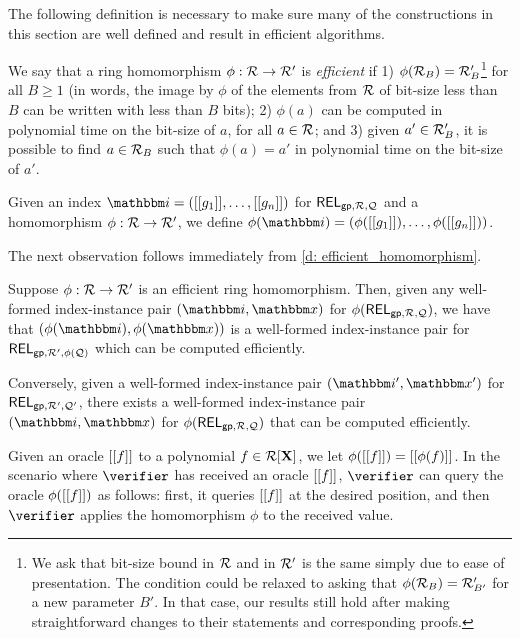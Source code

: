 \documentclass[11pt,letterpaper,usenames,dvipsnames]{article}
\begin{document}
    The following definition is necessary to make sure many of the constructions in this section are well defined and result in efficient algorithms. 

    \begin{definition}\label{d: efficient_homomorphism}
        We say that a ring homomorphism $\phi:\mathcal{R} \to \mathcal{R}'$ is \emph{efficient} if 1) $\phi(\mathcal{R}_B)= \mathcal{R}_B'$\footnote{We ask that  bit-size bound in $\mathcal{R}$ and in $\mathcal{R}'$ is the same simply due to ease of presentation. The  condition could be relaxed to asking that $\phi(\mathcal{R}_B)= \mathcal{R}_{B'}'$ for a new parameter $B'$. In that case, our results still hold after making straightforward changes to their statements and corresponding proofs.} for all $B\geq 1$ (in words, the image by $\phi$ of the elements from $\mathcal{R}$ of bit-size less than $B$ can be written with less than $B$ bits); 2) $\phi(a)$ can be computed in polynomial time on the bit-size of $a$, for all $a\in \mathcal{R}$; and 3) given $a'\in \mathcal{R}_B'$, it is possible to find $a\in \mathcal{R}_B$ such that $\phi(a)=a'$ in polynomial time on the bit-size of $a'$.
    \end{definition}

    Given an index $\idx=(\oracle{g_1},\ldots, \oracle{g_n})$ for $\mathsf{REL}_{\mathsf{gp}, \mathcal{R}, \mathcal{Q}}$ and a homomorphism $\phi:\mathcal{R} \to \mathcal{R}'$, we define $\phi(\idx)=( \phi(\oracle{g_1}),\ldots, \phi(\oracle{g_n}))$.

The next observation follows immediately from \cref{d: efficient_homomorphism}.
\begin{remark}\label{r: well_formedness_preservation}
Suppose $\phi:\mathcal{R} \to \mathcal{R}'$  is an efficient ring homomorphism. Then, given any well-formed index-instance pair $(\idx,\inp)$ for $\phi(\mathsf{REL}_{\mathsf{gp},\mathcal{R},\mathcal{Q}})$, we have that $(\phi(\idx), \phi(\inp))$ is a well-formed index-instance pair for $\mathsf{REL}_{\mathsf{gp},\mathcal{R}', \phi(\mathcal{Q})}$ which can be computed efficiently. 

Conversely, given a well-formed index-instance pair $(\idx',\inp')$ for $\mathsf{REL}_{\mathsf{gp},\mathcal{R}',\mathcal{Q}'}$, there exists a well-formed index-instance pair $(\idx,\inp)$ for $\phi(\mathsf{REL}_{\mathsf{gp},\mathcal{R},\mathcal{Q}})$ that can be computed efficiently.
\end{remark}

    
    Given an oracle $[[{f}]]$ to a polynomial $f\in \mathcal{R}[\mathbf{X}]$, we let $\phi([[{f}]])= [[{\phi(f)}]]$. In the scenario where $\verifier$ has received an oracle $[[{f}]]$, $\verifier$ can query the oracle $\phi([[{f}]])$ as follows: first, it queries $[[{f}]]$ at the desired position, and then $\verifier$ applies the homomorphism $\phi$ to the received value. %
\end{document}
